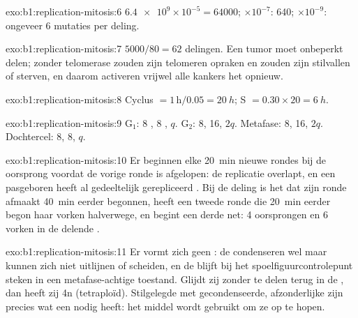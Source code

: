 \begin{solution}{exo:b1:replication-mitosis:6}
$\num{6.4e9}\times 10^{-5} = \num{64000}$; $\times 10^{-7}$: 640;
$\times 10^{-9}$: ongeveer 6 mutaties per deling.
\end{solution}

\begin{solution}{exo:b1:replication-mitosis:7}
$5000/80 = 62$ delingen. Een tumor moet onbeperkt delen; zonder telomerase zouden
zijn telomeren opraken en zouden zijn  stilvallen of sterven, en daarom
activeren vrijwel alle kankers het  opnieuw.
\end{solution}

\begin{solution}{exo:b1:replication-mitosis:8}
Cyclus $= 1\,\mathrm{h}/0.05 = \qty{20}{h}$; S $= 0.30\times 20 =
\qty{6}{h}$.
\end{solution}

\begin{solution}{exo:b1:replication-mitosis:9}
G$_1$: 8 , 8 , $q$. G$_2$: 8, 16, $2q$. Metafase: 8, 16,
$2q$. Dochtercel: 8, 8, $q$.
\end{solution}

\begin{solution}{exo:b1:replication-mitosis:10}
Er beginnen elke \qty{20}{min} nieuwe rondes bij de oorsprong voordat de vorige
ronde is afgelopen: de replicatie overlapt, en een pasgeboren  heeft al
gedeeltelijk gerepliceerd . Bij de deling is het  dat zijn ronde
afmaakt \qty{40}{min} eerder begonnen, heeft een tweede ronde die \qty{20}{min}
eerder begon haar vorken halverwege, en begint een derde net: 4 oorsprongen en 6
vorken in de delende .
\end{solution}

\begin{solution}{exo:b1:replication-mitosis:11}
Er vormt zich geen : de  condenseren wel maar kunnen zich
niet uitlijnen of scheiden, en de  blijft bij het spoelfiguurcontrolepunt steken
in een metafase-achtige toestand. Glijdt zij zonder te delen terug in de ,
dan heeft zij 4n  (tetraploïd). Stilgelegde  met gecondenseerde,
afzonderlijke  zijn precies wat een  nodig heeft: het middel
wordt gebruikt om ze op te hopen.
\end{solution}

